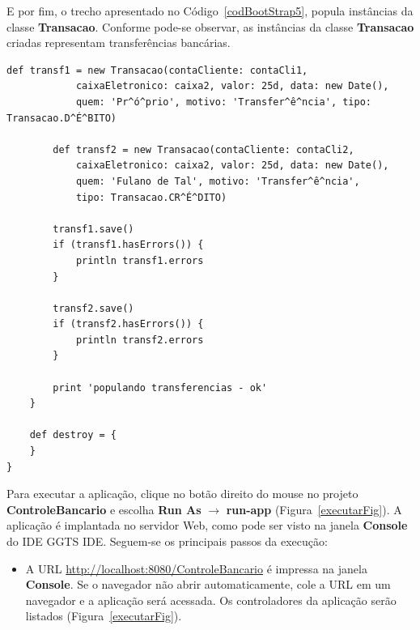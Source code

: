 \newpage

E por fim, o trecho apresentado no Código~\ref{codBootStrap5}, popula instâncias
da classe  {\bf Transacao}. Conforme  pode-se observar, as instâncias  da classe
{\bf Transacao} criadas representam transferências bancárias.

\begin{lstlisting}[caption={\bf BootStrap.groovy (5)}, frame = trBL, float=htbp,
    label=codBootStrap5] 
        def transf1 = new Transacao(contaCliente: contaCli1, 
            caixaEletronico: caixa2, valor: 25d, data: new Date(),
            quem: 'Pr^ó^prio', motivo: 'Transfer^ê^ncia', tipo: Transacao.D^É^BITO)
        
        def transf2 = new Transacao(contaCliente: contaCli2, 
            caixaEletronico: caixa2, valor: 25d, data: new Date(),
            quem: 'Fulano de Tal', motivo: 'Transfer^ê^ncia', 
            tipo: Transacao.CR^É^DITO)
        
        transf1.save()
        if (transf1.hasErrors()) {
            println transf1.errors
        }
        
        transf2.save()
        if (transf2.hasErrors()) {
            println transf2.errors
        }
        
        print 'populando transferencias - ok'
    }

    def destroy = {
    }
}
\end{lstlisting}

\vspace{0.3cm}

Para executar  a aplicação,  clique no  botão direito do  mouse no  projeto {\bf
  ControleBancario}  e   escolha  {\bf  Run  As}   $\rightarrow$  {\bf  run-app}
(Figura~\ref{executarFig}).  A aplicação é implantada no servidor Web, como pode 
ser  visto na  janela {\bf  Console} do  IDE GGTS  IDE. Seguem-se  os principais
passos da execução: 

\vspace{0.3cm}

\begin{itemize}

\item   A   URL  {\footnotesize\url{http://localhost:8080/ControleBancario}}   é
  impressa na  janela {\bf Console}.  Se o navegador não  abrir automaticamente,
  cole a  URL em um navegador e  a aplicação será acessada.  Os controladores da
  aplicação serão listados (Figura~\ref{executarFig}).

\end{itemize}

